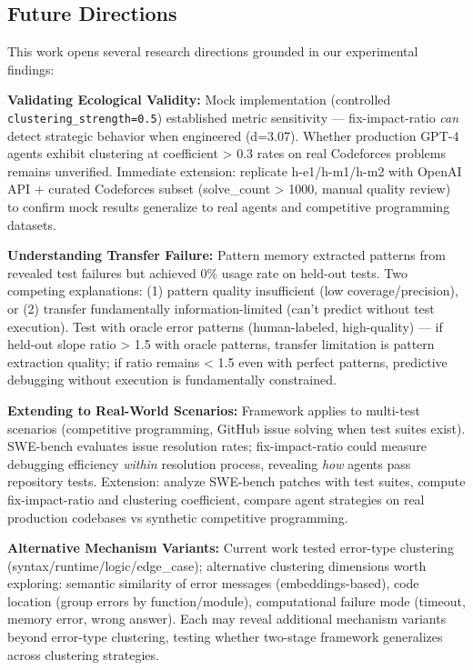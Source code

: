 \subsection{Future Directions}

This work opens several research directions grounded in our experimental findings:

\textbf{Validating Ecological Validity:} Mock implementation (controlled \texttt{clustering\_strength=0.5}) established metric sensitivity — fix-impact-ratio \emph{can} detect strategic behavior when engineered (d=3.07). Whether production GPT-4 agents exhibit clustering at coefficient > 0.3 rates on real Codeforces problems remains unverified. Immediate extension: replicate h-e1/h-m1/h-m2 with OpenAI API + curated Codeforces subset (solve\_count > 1000, manual quality review) to confirm mock results generalize to real agents and competitive programming datasets.

\textbf{Understanding Transfer Failure:} Pattern memory extracted patterns from revealed test failures but achieved 0\% usage rate on held-out tests. Two competing explanations: (1) pattern quality insufficient (low coverage/precision), or (2) transfer fundamentally information-limited (can't predict without test execution). Test with oracle error patterns (human-labeled, high-quality) — if held-out slope ratio > 1.5 with oracle patterns, transfer limitation is pattern extraction quality; if ratio remains < 1.5 even with perfect patterns, predictive debugging without execution is fundamentally constrained.

\textbf{Extending to Real-World Scenarios:} Framework applies to multi-test scenarios (competitive programming, GitHub issue solving when test suites exist). SWE-bench evaluates issue resolution rates; fix-impact-ratio could measure debugging efficiency \emph{within} resolution process, revealing \emph{how} agents pass repository tests. Extension: analyze SWE-bench patches with test suites, compute fix-impact-ratio and clustering coefficient, compare agent strategies on real production codebases vs synthetic competitive programming.

\textbf{Alternative Mechanism Variants:} Current work tested error-type clustering (syntax/runtime/logic/edge\_case); alternative clustering dimensions worth exploring: semantic similarity of error messages (embeddings-based), code location (group errors by function/module), computational failure mode (timeout, memory error, wrong answer). Each may reveal additional mechanism variants beyond error-type clustering, testing whether two-stage framework generalizes across clustering strategies.

